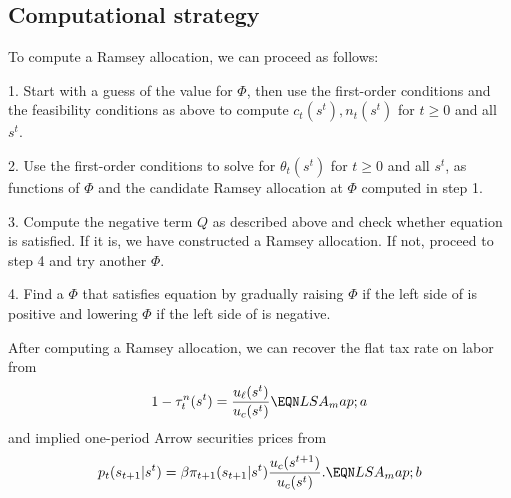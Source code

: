 \subsection{Computational  strategy}

To
compute a Ramsey allocation, we can proceed as follows:

\medskip

\item{1.} Start with a guess of the value for $\Phi$,  then use the first-order conditions    and the
feasibility conditions 
as above to compute $c_t(s^t), n_t(s^t)$ for $t \geq 0$ and all $s^t$.


\medskip
\item{2.} Use the first-order conditions  to solve for $\theta_t(s^t)$ for $t \geq 0$ and all $s^t$,
as functions of $\Phi$ and  the candidate Ramsey allocation at $\Phi$ computed in step 1.

\medskip

\item{3.}  Compute the negative term $Q$ as described above and check
whether equation  is satisfied.  If it is, we have constructed
a Ramsey allocation. If not, proceed to step 4 and try another $\Phi$.

\medskip

\item{4.}  Find a $\Phi$ that satisfies equation  by gradually raising $\Phi$ if the
left side of  is positive and lowering $\Phi$ if the left side of 
is negative.

\medskip

\noindent After computing a Ramsey allocation, we can recover the flat tax rate on labor from
$$ 1 - \tau_t^n(s^t) = {\frac{u_\ell(s^t)}{u_c(s^t)} }  \EQN LSA_map;a $$
and  implied one-period Arrow securities prices from
$$ p_{t}(s_{t+1}| s^t) = \beta \pi_{t+1}(s_{t+1} | s^t) {\frac{u_c(s^{t+1})}{u_c({s^t})}} .\EQN LSA_map;b $$






